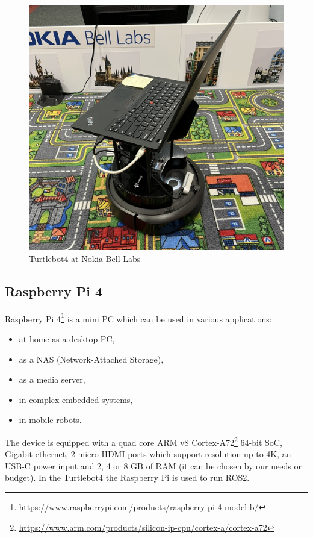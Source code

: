 \begin{figure}[H]
    \centering
    \includegraphics[width=150mm, keepaspectratio]{figures/turtlebot4_nokia.JPEG}
    \caption{Turtlebot4 at Nokia Bell Labs}
    \label{fig:turtlebot4_nokia}
\end{figure}

\subsection{Raspberry Pi 4}

Raspberry Pi 4\footnote{\url{https://www.raspberrypi.com/products/raspberry-pi-4-model-b/}} is a mini PC which can be used in various applications:
\begin{itemize}
    \item at home as a desktop PC,
    \item as a NAS (Network-Attached Storage),
    \item as a media server,
    \item in complex embedded systems,
    \item in mobile robots.
\end{itemize}
The device is equipped with a quad core ARM v8 Cortex-A72\footnote{\url{https://www.arm.com/products/silicon-ip-cpu/cortex-a/cortex-a72}} 64-bit SoC, Gigabit ethernet, 2 micro-HDMI ports which support resolution up to 4K, an USB-C power input and 2, 4 or 8 GB of RAM (it can be chosen by our needs or budget). In the Turtlebot4 the Raspberry Pi is used to run ROS2.


